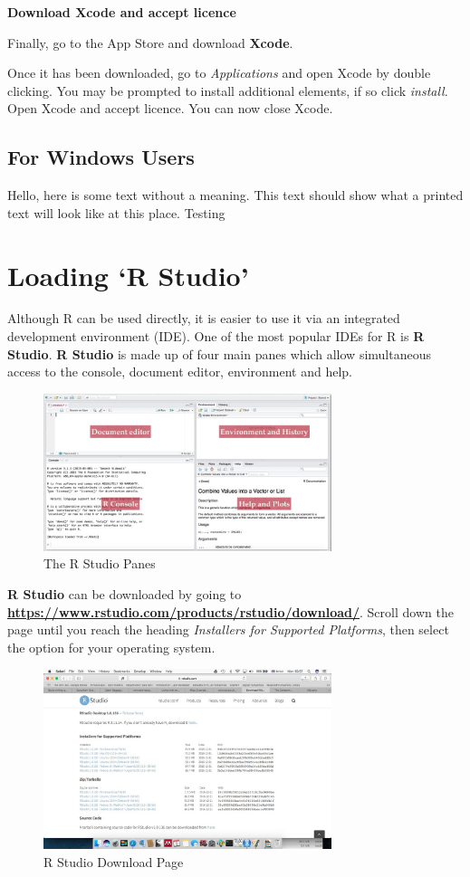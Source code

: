\documentclass[12pt]{article}
\begin{document}
\textbf{Download Xcode and accept licence}

Finally, go to the App Store and download \textbf{Xcode}. 
 
Once it has been downloaded, go to \textit{Applications} and open Xcode by double clicking. You may be prompted to install additional elements, if so click \textit{install}. Open Xcode and accept licence. You can now close Xcode.

\subsection*{For Windows Users}
Hello, here is some text without a meaning.  This text should show what 
a printed text will look like at this place.
Testing

\section{Loading `R Studio'}
Although R can be used directly, it is easier to use it via an integrated development environment (IDE). One of the most popular IDEs for R is \textbf{R Studio}. \textbf{R Studio} is made up of four main panes which allow simultaneous access to the console, document editor, environment and help.
\begin{figure}[h]
	\centering
	\includegraphics[width=0.75\textwidth]{rstudiopanes.jpg}
	\caption{The R Studio Panes}
\end{figure}

\textbf{R Studio} can be downloaded by going to \textbf{\url{https://www.rstudio.com/products/rstudio/download/}}. Scroll down the page until you reach the heading \textit{Installers for Supported Platforms}, then select the option for your operating system. 

\begin{figure}[h]
	\centering
	\includegraphics[width=0.75\textwidth]{rstudio.jpg}
	\caption{R Studio Download Page}
\end{figure}
\end{document}
